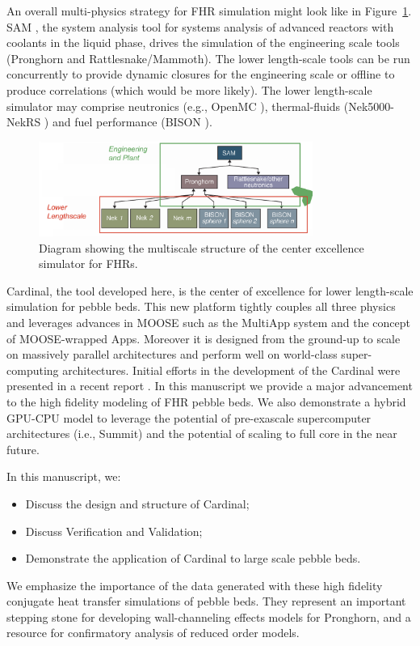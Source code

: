 An overall multi-physics strategy for FHR simulation might look like in Figure~\ref{f:fhr1}. SAM \cite{hu2017sam}, the system analysis tool for systems analysis of advanced reactors with coolants in the liquid phase, drives the simulation of the engineering scale tools (Pronghorn and Rattlesnake/Mammoth). The lower length-scale tools can be run concurrently to provide dynamic closures for the engineering scale or offline to produce correlations (which would be more likely). The lower length-scale simulator may comprise neutronics (e.g., OpenMC \cite{romano2013openmc}), thermal-fluids (Nek5000-NekRS \cite{fischer2008}) and fuel performance (BISON \cite{hales2013triso}).

\begin{figure}[!h]
\centering
\includegraphics[clip=true,width=0.8\textwidth]{Figures/fhr_graph}
\caption{Diagram showing the multiscale structure of the center excellence simulator for FHRs.}
\label{f:fhr1}
\end{figure}

Cardinal, the tool developed here, is the center of excellence for lower length-scale simulation for pebble beds. This new platform tightly couples all three physics and leverages advances in MOOSE \cite{gaston2009moose} such as the MultiApp system and the concept of MOOSE-wrapped Apps. Moreover it is designed from the ground-up to scale on massively parallel architectures and perform well on world-class super-computing architectures. Initial efforts in the development of the Cardinal were presented in a recent report \cite{cardinal}. In this manuscript we provide a major advancement to the high fidelity modeling of FHR pebble beds. We also demonstrate a hybrid GPU-CPU model to leverage the potential of pre-exascale supercomputer architectures (i.e., Summit) and the potential of scaling to full core in the near future.

In this manuscript, we:
\begin{itemize}
\item Discuss the design and structure of Cardinal;
\item Discuss Verification and Validation;
\item Demonstrate the application of Cardinal to large scale pebble beds.
\end{itemize}

We emphasize the importance of the data generated with these high fidelity conjugate heat transfer simulations of pebble beds. They represent an important stepping stone for developing wall-channeling effects models for Pronghorn, and a resource for confirmatory analysis of reduced order models.
